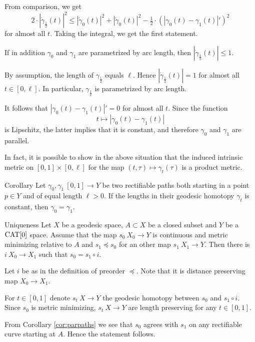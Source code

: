 \documentclass{article}
\begin{document}
From comparison, we get
\[2\cdot|\dot\gamma_{\frac12}(t)|^2
\le
|\dot\gamma_{0}(t)|^2
+|\dot\gamma_{0}(t)|^2
-\tfrac12\cdot(|\gamma_{0}(t)-\gamma_{1}(t)|')^2\] 
for almost all $t$.
Taking the integral, we get the first statement.

If in addition $\gamma_0$ and $\gamma_1$ are parametrized by arc length, 
then $|\dot\gamma_{\frac12}(t)|\le 1$.

By assumption, the length of $\gamma_{\frac12}$ equals $\ell$. 
Hence $|\dot\gamma_{\frac12}(t)|=1$ for almost all $t\in[0,\ell]$. 
In particular, $\gamma_{\frac12}$
is parametrized by arc length. 

It follows that $|\gamma_{0}(t)-\gamma_{1}(t)|'=0$ for almost all $t$.
Since the function 
\[t\mapsto |\gamma_{0}(t)-\gamma_{1}(t)|\] 
is Lipschitz,
the latter  implies that it is constant,
and therefore $\gamma_{0}$ and $\gamma_{1}$ are parallel.
\qeds

In fact, it is possible to show in the above situation that the induced intrinsic metric on $[0,1]\times[0,\ell]$
for the map $(t,\tau)\mapsto \gamma_t(\tau)$ is a product metric.

\begin{thm}{Corollary}\label{cor:parpaths}
Let $\gamma_0,\gamma_1\:[0,1]\to Y$ be two rectifiable paths both starting in a point $p\in Y$ and of equal length $\ell>0$. 
If the lengths in their geodesic homotopy $\gamma_t$ is constant, then $\gamma_{0}=\gamma_{1}$.
\end{thm}

\begin{thm}{Uniqueness}\label{prop:strict-mm}
Let $X$ be a geodesic space, 
$A\subset X$ be a closed subset 
and $Y$ be a $\mathop{\rm CAT}\nolimits[0]$ space.
Assume that the map $s_0\:X_0\to Y$ is continuous and metric minimizing relative to $A$ and 
$s_1\preccurlyeq s_0$ for an other map $s_1\:X_1\to Y$.
Then there is $i\:X_0\to X_1$ such that $s_0=s_1\circ i$.
\end{thm}

Let $i$ be as in the definition of preorder  $\preccurlyeq$.
Note that it is distance preserving map $X_0\to X_1$.

For $t\in[0,1]$ denote $s_t\:X\to Y$ the geodesic homotopy between $s_0$ and $s_1\circ i$. 
Since $s_0$ is metric minimizing, $s_t\:X\to Y$ are length preserving for any $t\in[0,1]$.

From Corollary \ref{cor:parpaths} we see that $s_0$ agrees with $s_1$ on any rectifiable curve starting at $A$.
Hence the statement follows.
\qeds
\end{document}
